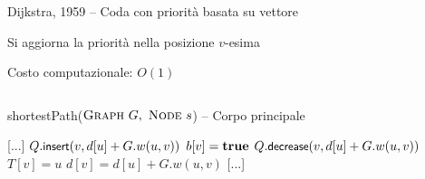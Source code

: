 \begin{frame}{Dijkstra, 1959 -- Coda con priorità basata su vettore}

\vspace{-9pt}
\begin{myboxtitle}
\BI
\item Si aggiorna la priorità nella posizione $v$-esima
\item Costo computazionale: $O(1)$
\EI
\end{myboxtitle}
    
\vspace{-18pt}
\begin{columns}
\small
\begin{Procedure}
\caption[A]{\textsf{shortestPath}($\textsc{Graph}\ G,\ \textsc{Node}\ s$) -- Corpo principale}
[...]\;
    {
      {
        $Q.\textsf{{\small insert}}(v, d[u]+G.w(u,v))$\;
        $b[v] = \TRUE$\;
      }
      {
        \alert{$Q.\textsf{{\small decrease}}(v, d[u]+G.w(u,v))$}
      }
      $T[v] = u$\;
      $d[v] = d[u] + G.w(u,v)$\;
    }
[...]\;
\end{Procedure}
\end{columns}

\end{frame}

